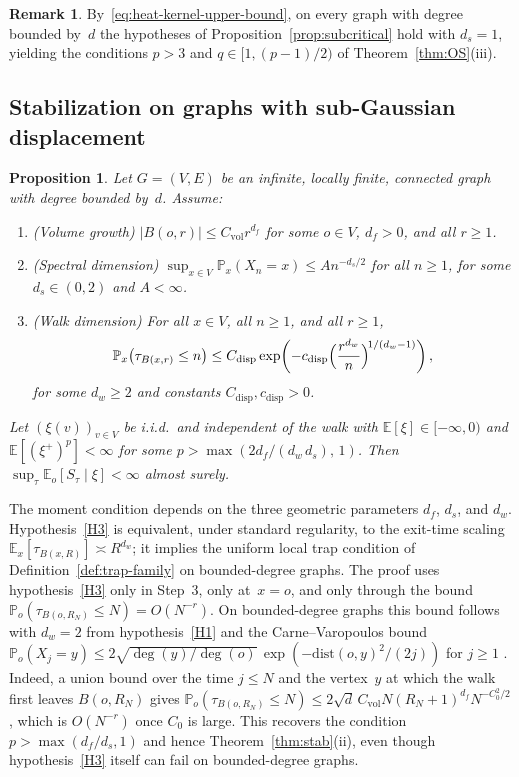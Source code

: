 \documentclass[aop]{imsart}
\theoremstyle{plain}
\newtheorem{proposition}[theorem]{Proposition}
\theoremstyle{definition}
\newtheorem{remark}[theorem]{Remark}
\newcommand{\E}{\mathbb{E}}
\renewcommand{\P}{\mathbb{P}}
\begin{document}
	\begin{remark}
		By~\eqref{eq:heat-kernel-upper-bound}, on every graph with degree bounded by~$d$ the hypotheses of Proposition~\ref{prop:subcritical} hold with $d_s=1$, yielding the conditions $p>3$ and $q\in[1,(p-1)/2)$ of Theorem~\ref{thm:OS}(iii).
	\end{remark}
	
	\subsection{Stabilization on graphs with sub-Gaussian displacement}\label{sec:poly-growth}
	
	\begin{proposition}\label{prop:poly-growth}
		Let $G=(V,E)$ be an infinite, locally finite, connected graph with degree bounded by~$d$.  Assume:
		\begin{enumerate}[label=\textup{(H\arabic*)}]
			\item\label{H1} \textup{(Volume growth)}\; $|B(o,r)|\leq C_{\mathrm{vol}} r^{d_f}$ for some $o\in V$, $d_f>0$, and all $r\geq 1$.
			\item\label{H2} \textup{(Spectral dimension)}\; $\sup_{x\in V}\P_x(X_n=x)\leq A n^{-d_s/2}$ for all $n\geq 1$, for some $d_s\in(0,2)$ and $A<\infty$.
			\item\label{H3} \textup{(Walk dimension)}\; For all $x\in V$, all $n\geq 1$, and all $r\geq 1$,
			\[
			\P_x\bigl(\tau_{B(x,r)}\leq n\bigr)\leq C_{\mathrm{disp}}\exp\biggl(-c_{\mathrm{disp}}\Bigl(\frac{r^{d_w}}{n}\Bigr)^{\!1/(d_w-1)}\biggr)\,,
			\]
			for some $d_w\geq 2$ and constants $C_{\mathrm{disp}},c_{\mathrm{disp}}>0$.
		\end{enumerate}
		Let $(\xi(v))_{v\in V}$ be i.i.d.\ and independent of the walk with $\E[\xi]\in[-\infty,0)$ and $\E[(\xi^+)^p]<\infty$ for some $p>\max(2d_f/(d_w\,d_s),\,1)$.  Then $\sup_\tau\E_o[S_\tau\mid\xi]<\infty$ almost surely.
	\end{proposition}
	
	The moment condition depends on the three geometric parameters $d_f$, $d_s$, and $d_w$. Hypothesis~\ref{H3} is equivalent, under standard regularity, to the exit-time scaling $\E_x[\tau_{B(x,R)}]\asymp R^{d_w}$; it implies the uniform local trap condition of Definition~\ref{def:trap-family} on bounded-degree graphs. The proof uses hypothesis~\ref{H3} only in Step~3, only at~$x=o$, and only through the bound $\P_o(\tau_{B(o,R_N)}\leq N)=O(N^{-r})$. On bounded-degree graphs this bound follows with $d_w=2$ from hypothesis~\ref{H1} and the Carne--Varopoulos bound $\P_o(X_j=y)\leq 2\sqrt{\deg(y)/\deg(o)}\,\exp(-\mathrm{dist}(o,y)^2/(2j))$ for $j\geq 1$ \citep[Theorem~13.4]{LP16}. Indeed, a union bound over the time $j\leq N$ and the vertex~$y$ at which the walk first leaves $B(o,R_N)$ gives $\P_o(\tau_{B(o,R_N)}\leq N)\leq 2\sqrt{d}\,C_{\mathrm{vol}}N(R_N+1)^{d_f}N^{-C_0^2/2}$, which is $O(N^{-r})$ once $C_0$ is large. This recovers the condition $p>\max(d_f/d_s,1)$ and hence Theorem~\ref{thm:stab}(ii), even though hypothesis~\ref{H3} itself can fail on bounded-degree graphs.
	
\end{document}
